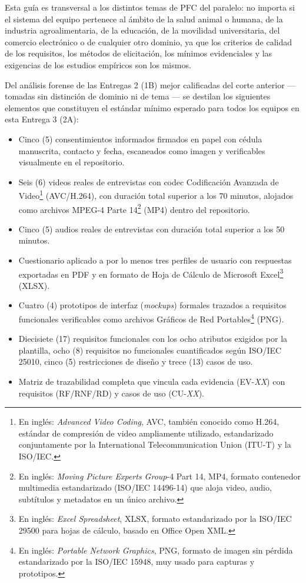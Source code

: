 \documentclass[11pt,a4paper]{article}
\begin{document}
Esta guía es transversal a los distintos temas de PFC del paralelo: no importa si el sistema del equipo pertenece al ámbito de la salud animal o humana, de la industria agroalimentaria, de la educación, de la movilidad universitaria, del comercio electrónico o de cualquier otro dominio, ya que los criterios de calidad de los requisitos, los métodos de elicitación, los mínimos evidenciales y las exigencias de los estudios empíricos son los mismos.

\begin{notabox}[title=Estándar mínimo tomado de los mejores documentos de la Entrega 2 (1B)]
Del análisis forense de las Entregas 2 (1B) mejor calificadas del corte anterior --- tomadas sin distinción de dominio ni de tema --- se destilan los siguientes elementos que constituyen el estándar mínimo esperado para todos los equipos en esta Entrega 3 (2A):
\begin{itemize}
    \item Cinco (5) consentimientos informados firmados en papel con cédula manuscrita, contacto y fecha, escaneados como imagen y verificables visualmente en el repositorio.
    \item Seis (6) videos reales de entrevistas con codec Codificación Avanzada de Video\footnote{En inglés: \emph{Advanced Video Coding}, AVC, también conocido como H.264, estándar de compresión de video ampliamente utilizado, estandarizado conjuntamente por la International Telecommunication Union (ITU-T) y la ISO/IEC.} (AVC/H.264), con duración total superior a los 70 minutos, alojados como archivos MPEG-4 Parte 14\footnote{En inglés: \emph{Moving Picture Experts Group}-4 Part 14, MP4, formato contenedor multimedia estandarizado (ISO/IEC 14496-14) que aloja video, audio, subtítulos y metadatos en un único archivo.} (MP4) dentro del repositorio.
    \item Cinco (5) audios reales de entrevistas con duración total superior a los 50 minutos.
    \item Cuestionario aplicado a por lo menos tres perfiles de usuario con respuestas exportadas en PDF y en formato de Hoja de Cálculo de Microsoft Excel\footnote{En inglés: \emph{Excel Spreadsheet}, XLSX, formato estandarizado por la ISO/IEC 29500 para hojas de cálculo, basado en Office Open XML.} (XLSX).
    \item Cuatro (4) prototipos de interfaz (\emph{mockups}) formales trazados a requisitos funcionales verificables como archivos Gráficos de Red Portables\footnote{En inglés: \emph{Portable Network Graphics}, PNG, formato de imagen sin pérdida estandarizado por la ISO/IEC 15948, muy usado para capturas y prototipos.} (PNG).
    \item Diecisiete (17) requisitos funcionales con los ocho atributos exigidos por la plantilla, ocho (8) requisitos no funcionales cuantificados según ISO/IEC 25010, cinco (5) restricciones de diseño y trece (13) casos de uso.
    \item Matriz de trazabilidad completa que vincula cada evidencia (EV-\emph{XX}) con requisitos (RF/RNF/RD) y casos de uso (CU-\emph{XX}).
\end{itemize}
\end{notabox}
\end{document}
